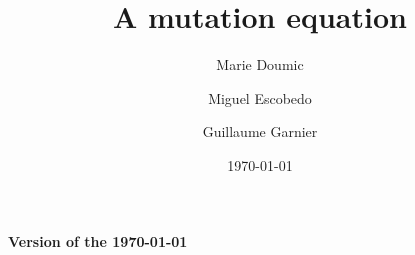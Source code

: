 \documentclass[11pt]{amsart}
\title{A mutation equation}
\author{Marie Doumic \and Miguel Escobedo \and Guillaume Garnier}
\date{\today}
\renewcommand{\Re}{\mathfrak{R}e}
\newcommand{\supp}{\mathrm{supp}\,}
\begin{document}
\maketitle
\begin{center}
    \textbf{Version of the \today}
\end{center}

\tableofcontents





    
    
\end{document}

